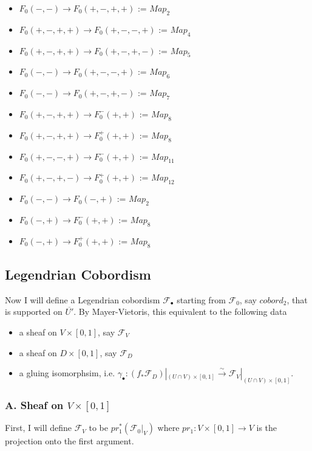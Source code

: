 \begin{itemize}
\item $F_0(-,-)\rightarrow F_0(+,-,+,+)$ := $Map_2$
\item $F_0(+,-,+,+)\rightarrow F_0(+,-,-,+)$ := $Map_4$
\item $F_0(+,-,+,+)\rightarrow F_0(+,-,+,-)$ := $Map_5$
\item $F_0(-,-)\rightarrow F_0(+,-,-,+)$ := $Map_6$
\item $F_0(-,-)\rightarrow F_0(+,-,+,-)$ := $Map_7$
\item $F_0(+,-,+,+)\rightarrow F_0^-(+,+)$ := $Map_8$
\item $F_0(+,-,+,+)\rightarrow F_0^+(+,+)$ := $Map_8$
\item $F_0(+,-,-,+)\rightarrow F_0^-(+,+)$ := $Map_{11}$
\item $F_0(+,-,+,-)\rightarrow F_0^+(+,+)$ := $Map_{12}$
\item $F_0(-,-)\rightarrow F_0(-,+)$ := $Map_2$
\item $F_0(-,+)\rightarrow F_0^-(+,+)$ := $Map_8$
\item $F_0(-,+)\rightarrow F_0^+(+,+)$ := $Map_8$
\end{itemize}

\subsection{Legendrian Cobordism}
Now I will define a Legendrian cobordism $\mathscr{F}_\bullet$ starting from $\mathscr{F}_0$, say $cobord_2$, that is supported on $\overline{U'}$. By Mayer-Vietoris, this equivalent to the following data
\begin{itemize}
\item a sheaf on $V\times [0,1]$, say $\mathscr{F}_V$

\item a sheaf on $D\times [0,1]$, say $\mathscr{F}_D$

\item a gluing isomorphsim, i.e. $\gamma_\bullet : (f_*\mathscr{F}_D)|_{(U\cap V)\times [0,1]} \xrightarrow{\sim} \mathscr{F}_V|_{(U\cap V)\times [0,1]}$.
\end{itemize}
\subsubsection{A. Sheaf on $V\times [0,1]$}
First, I will define $\mathscr{F}_V$ to be $pr_1^*(\mathscr{F}_0|_V)$ where $pr_1 : V \times [0,1] \rightarrow V$ is the projection onto the first argument.
